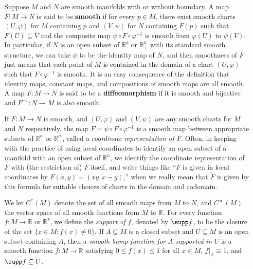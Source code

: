 Suppose $M$ and $N$ are smooth manifolds with or without boundary. A map $F: M \to N$ is said to be \textbf{smooth} if for every $p \in M$, there exist smooth charts $(U, \varphi)$ for $M$ containing $p$ and $(V, \psi)$ for $N$ containing $F(p)$ such that $F(U) \subseteq V$ and the composite map $\psi \circ F \circ \varphi^{-1}$ is smooth from $\varphi(U)$ to $\psi(V)$. In particular, if $N$ is an open subset of $\mathbb{R}^k$ or $\mathbb{R}^k_+$ with its standard smooth structure, we can take $\psi$ to be the identity map of $N$, and then smoothness of $F$ just means that each point of $M$ is contained in the domain of a chart $(U, \varphi)$ such that $F \circ \varphi^{-1}$ is smooth. It is an easy consequence of the definition that identity maps, constant maps, and compositions of smooth maps are all smooth. A map $F: M \to N$ is said to be a \textbf{diffeomorphism} if it is smooth and bijective and $F^{-1}: N \to M$ is also smooth.

If $F: M \to N$ is smooth, and $(U, \varphi)$ and $(V, \psi)$ are any smooth charts for $M$ and $N$ respectively, the map $\bar{F} = \psi \circ F \circ \varphi^{-1}$ is a smooth map between appropriate subsets of $\mathbb{R}^n$ or $\mathbb{R}^n_+$, called a \textit{coordinate representation of $F$}. Often, in keeping
with the practice of using local coordinates to identify an open subset of a manifold
with an open subset of $\mathbb{R}^n$, we identify the coordinate representation of $F$ with (the
restriction of) $F$ itself, and write things like ``$F$ is given in local coordinates by
$F(x,y) = (xy, x-y)$,'' when we really mean that $\tilde{F}$ is given by this formula for
suitable choices of charts in the domain and codomain.

We let $C^*(M)$ denote the set of all smooth maps from $M$ to $N$, and
$C^{\infty}(M)$ the vector space of all smooth functions from $M$ to $\mathbb{R}$. For every function
$f : M \to \mathbb{R}$ or $\mathbb{R}^k$, we define the \textit{support of $f$}, denoted by $\supp f$, to be the closure
of the set $\{x \in M : f(x) \neq 0\}$. If $A \subseteq M$ is a closed subset and $U \subseteq M$ is an
open subset containing $A$, then a \textit{smooth bump function for $A$ supported in $U$} is a
smooth function $f : M \to \mathbb{R}$ satisfying $0 \le f(x) \le 1$ for all $x \in M$, $f|_A \equiv 1$, and
$\supp f \subseteq U$.

